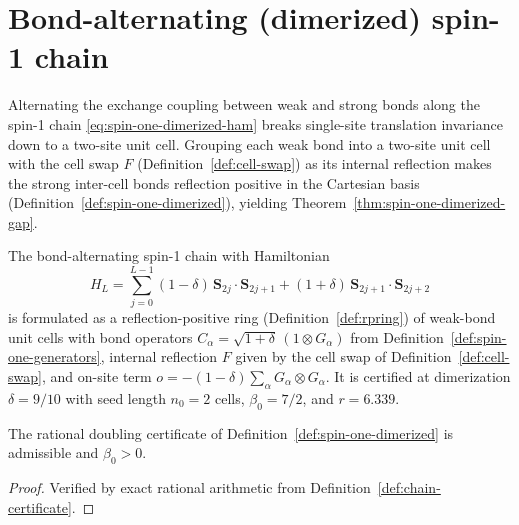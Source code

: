 \section{Bond-alternating (dimerized) spin-1 chain}

Alternating the exchange coupling between weak and strong bonds along the spin-1 chain
\eqref{eq:spin-one-dimerized-ham} breaks single-site translation invariance down to a two-site unit
cell. Grouping each weak bond into a two-site unit cell with the cell swap \(F\)
(Definition~\ref{def:cell-swap}) as its internal reflection makes the strong inter-cell bonds
reflection positive in the Cartesian basis (Definition~\ref{def:spin-one-dimerized}), yielding
Theorem~\ref{thm:spin-one-dimerized-gap}.

\begin{definition}
  \label{def:spin-one-dimerized}
  \leanok
  The bond-alternating spin-1 chain with Hamiltonian
  \begin{equation}
    \label{eq:spin-one-dimerized-ham}
    H_L = \sum_{j=0}^{L-1} (1-\delta)\, \mathbf S_{2j} \cdot \mathbf S_{2j+1} + (1+\delta)\,
    \mathbf S_{2j+1} \cdot \mathbf S_{2j+2}
  \end{equation}
  is formulated as a reflection-positive ring (Definition~\ref{def:rpring}) of weak-bond unit cells
  with bond operators \(C_\alpha = \sqrt{1+\delta}\,(1 \otimes G_\alpha)\) from
  Definition~\ref{def:spin-one-generators}, internal reflection \(F\) given by the cell swap of
  Definition~\ref{def:cell-swap}, and on-site term
  \(o = -(1-\delta) \sum_\alpha G_\alpha \otimes G_\alpha\). It is certified at dimerization
  \(\delta = 9/10\) with seed length \(n_0 = 2\) cells, \(\beta_0 = 7/2\), and \(r = 6.339\).
\end{definition}

\begin{lemma}
  \label{lem:spin-one-dimerized-valid}
  \leanok
  The rational doubling certificate of Definition~\ref{def:spin-one-dimerized} is admissible and
  \(\beta_0 > 0\).
\end{lemma}
\begin{proof}
  \leanok
  Verified by exact rational arithmetic from Definition~\ref{def:chain-certificate}.
\end{proof}

